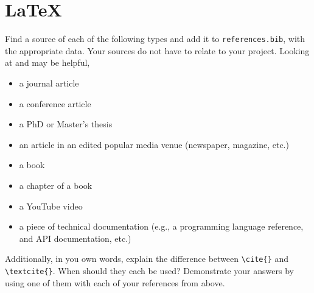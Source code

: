 \documentclass[10pt,twocolumn]{article}
\begin{document}
\section{\LaTeX}

Find a source of each of the following types and add it to \texttt{references.bib}, with the appropriate data. Your sources do not have to relate to your project. Looking at \textcite{OverleafBibliographyManagement} and \textcite{WikipediaBibtex} may be helpful,

\begin{itemize}
\item a journal article
\item a conference article
\item a PhD or Master's thesis
\item an article in an edited popular media venue (newspaper, magazine, etc.)
\item a book
\item a chapter of a book
\item a YouTube video
\item a piece of technical documentation (e.g., a programming language reference, and API documentation, etc.)
\end{itemize}

Additionally, in you own words, explain the difference between \texttt{{\textbackslash}cite\{\}} and \texttt{{\textbackslash}textcite\{\}}. When should they each be used? Demonstrate your answers by using one of them with each of your references from above.

\printbibliography
\end{document}
